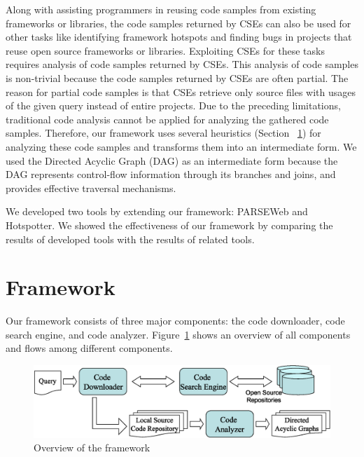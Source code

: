 \documentclass{sigplanconf}
\begin{document}
Along with assisting programmers in reusing code samples
from existing frameworks or libraries, the code samples 
returned by CSEs can also be used for other tasks 
like identifying framework hotspots and finding bugs in projects 
that reuse open source frameworks or libraries. 
Exploiting CSEs for these tasks requires analysis of 
code samples returned by CSEs. This analysis of code samples 
is non-trivial because the code samples returned by CSEs are often partial. 
The reason for partial code samples is that CSEs retrieve 
only source files with usages of the given query instead of entire projects. 
Due to the preceding limitations, traditional code analysis cannot be applied 
for analyzing the gathered code samples. Therefore, our framework 
uses several heuristics (Section ~\ref{sec:framework}) 
for analyzing these code samples and transforms them into 
an intermediate form. We used the Directed Acyclic Graph
(DAG) as an intermediate form because the DAG represents control-flow information
through its branches and joins, and provides effective traversal mechanisms. 

We developed two tools by extending our framework: PARSEWeb
and Hotspotter. We showed the effectiveness of our framework by comparing the results 
of developed tools with the results of related tools.

\section{Framework}
\label{sec:framework}

Our framework consists of three major components: the code downloader,
code search engine, and code analyzer. Figure~\ref{fig:architecture}
shows an overview of all components and flows among different components.

\begin{figure}[t]
\centering
\includegraphics[scale=0.34,clip]{Framework1.eps}
\caption{Overview of the framework} \label{fig:architecture}
\vspace*{-1ex}
\end{figure}
\end{document}
